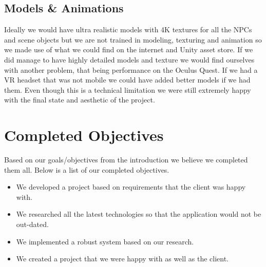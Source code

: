 \subsection{Models \& Animations}
Ideally we would have ultra realistic models with 4K textures for all the NPCs and scene objects but we are not trained in modeling, texturing and animation so we made use of what we could find on the internet and Unity asset store. If we did manage to have highly detailed models and texture we would find ourselves with another problem, that being performance on the Oculus Quest. If we had a VR headset that was not mobile we could have added better models if we had them. Even though this is a technical limitation we were still extremely happy with the final state and aesthetic of the project.

\section{Completed Objectives}
Based on our goals/objectives from the introduction we believe we completed them all. Below is a list of our completed objectives.

\begin{itemize}
    \item We developed a project based on requirements that the client was happy with.
    \item We researched all the latest technologies so that the application would not be out-dated.
    \item We implemented a robust system based on our research.
    \item We created a project that we were happy with as well as the client.
\end{itemize}




